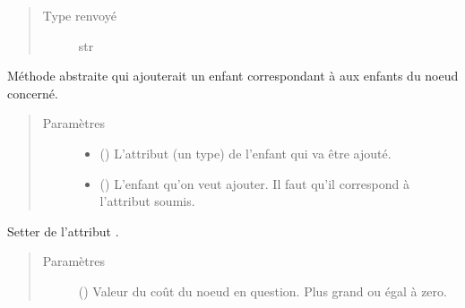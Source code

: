 \documentclass[letterpaper,10pt,french]{sphinxmanual}
\begin{document}
\begin{fulllineitems}
\begin{fulllineitems}
\begin{quote}
\begin{description}
\item[{Type renvoyé}] \leavevmode
str

\end{description}\end{quote}

\end{fulllineitems}


\begin{fulllineitems}
\label{\detokenize{index:StrategyTree.NodeST.set_child_by_attribute}}
Méthode abstraite qui ajouterait un enfant correspondant à  aux
enfants du noeud concerné.
\begin{quote}\begin{description}
\item[{Paramètres}] \leavevmode\begin{itemize}
\item {} 
 () \textendash{} L’attribut (un type) de l’enfant qui va être ajouté.

\item {} 
 ({\hyperref[\detokenize{index:StrategyTree.NodeST}]{}}\sphinxstyleliteralemphasis{\sphinxupquote{, }}) \textendash{} L’enfant qu’on veut ajouter. Il faut qu’il correspond à l’attribut
soumis.

\end{itemize}

\end{description}\end{quote}

\end{fulllineitems}


\begin{fulllineitems}
\label{\detokenize{index:StrategyTree.NodeST.set_cost}}
Setter de l’attribut .
\begin{quote}\begin{description}
\item[{Paramètres}] \leavevmode
{} () \textendash{} Valeur du coût du noeud en question. Plus grand ou égal à zero.


\end{description}
\end{quote}
\end{fulllineitems}
\end{fulllineitems}
\end{document}
